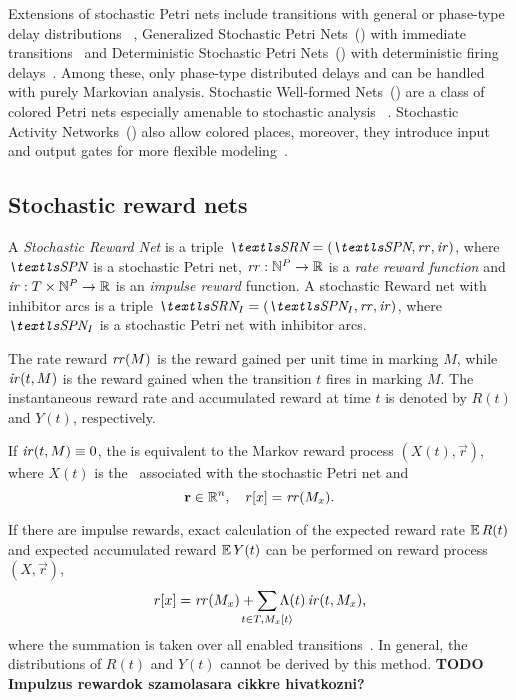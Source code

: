 Extensions of stochastic Petri nets include transitions with general
or phase-type delay distributions%
~\citep{DBLP:journals/tse/MarsanBBCCC89,Longo:2015:TSR:2767455.2767457},
Generalized Stochastic Petri Nets~() with immediate
transitions~\citep{DBLP:journals/tocs/MarsanCB84,DBLP:journals/tse/TeruelFP03}
and Deterministic Stochastic Petri Nets~() with
deterministic firing delays~\citep{DBLP:conf/apn/1986}. Among these,
only phase-type distributed delays and  can be handled
with purely Markovian analysis. Stochastic Well-formed
Nets~() are a class of colored Petri nets especially
amenable to stochastic analysis%
~\citep{DBLP:journals/tc/ChiolaDFH93}. Stochastic Activity
Networks~() also allow colored places, moreover, they
introduce input and output gates for more flexible
modeling~\citep{DBLP:conf/pnpm/1985}.

\subsection{Stochastic reward nets}

\begin{dfn}
  A \emph{Stochastic Reward Net} is a triple
  $\SRN = (\SPN, \rateReward, \impulseReward)$, where $\SPN$ is a
  stochastic Petri net,
  $\mathit{rr}: \mathbb{N}^P \to \mathbb{R}$ is a \emph{rate reward function} and
  $\mathit{ir}: T \times \mathbb{N}^P \to \mathbb{R}$ is an \emph{impulse reward}
  function. A stochastic Reward net with inhibitor arcs is a triple
  $\SRN_I = (\SPN_I, \rateReward, \impulseReward)$, where $\SPN_I$ is
  a stochastic Petri net with inhibitor arcs.
\end{dfn}

The rate reward $\mathit{rr}(M)$ is the reward gained per unit time in
marking $M$, while $\mathit{ir}(t, M)$ is the reward gained when
the transition $t$ fires in marking $M$. The instantaneous reward rate
and accumulated reward at time $t$ is denoted by $R(t)$ and $Y(t)$,
respectively.

If $\mathit{ir}(t, M) \equiv 0$, the  is
equivalent to the Markov reward process $(X(t), \vec{r})$, where
$X(t)$ is the \CTMC\ associated with the stochastic Petri net and
\begin{equation}
  \bm{\mathrm{r}} \in \mathbb{R}^n, \quad r[x] = \mathit{rr}(M_x) \text.
\end{equation}

If there are impulse rewards, exact calculation of the expected reward
rate $\operatorname{\mathbb{E}} R(t)$ and expected accumulated reward $\operatorname{\mathbb{E}} Y(t)$ can be
performed on reward process $(X, \vec{r})$,
\begin{equation}
  r[x] = \rateReward(M_x) + \sum_{\mathclap{t \in T, M_x
      \tranto{t}}} \Lambda(t) \, \impulseReward(t, M_x) \text,
\end{equation}
where the summation is taken over all enabled
transitions~\citep{DBLP:journals/pe/CiardoMT91}. In general, the
distributions of $R(t)$ and $Y(t)$ cannot be derived by this
method. \textbf{TODO Impulzus rewardok szamolasara cikkre hivatkozni?}

